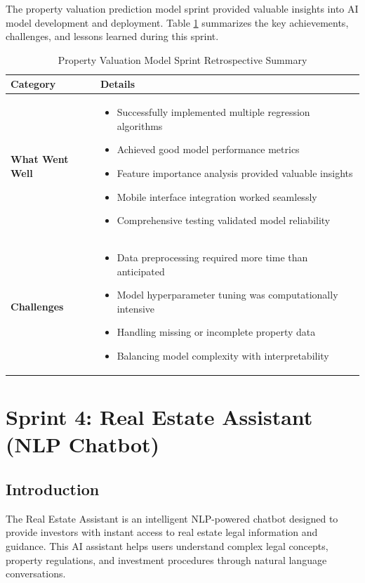 The property valuation prediction model sprint provided valuable insights into AI model development and deployment. Table \ref{tab:valuation-retrospective} summarizes the key achievements, challenges, and lessons learned during this sprint.
\newpage
\begin{table}[htbp]
    \centering
    \begin{tabular}{|p{3cm}|p{10cm}|}
        \hline
        \textbf{Category} & \textbf{Details} \\
        \hline
        \textbf{What Went Well} & 
        \begin{itemize}
            \item Successfully implemented multiple regression algorithms
            \item Achieved good model performance metrics
            \item Feature importance analysis provided valuable insights
            \item Mobile interface integration worked seamlessly
            \item Comprehensive testing validated model reliability
        \end{itemize} \\
        \hline
        \textbf{Challenges} & 
        \begin{itemize}
            \item Data preprocessing required more time than anticipated
            \item Model hyperparameter tuning was computationally intensive
            \item Handling missing or incomplete property data
            \item Balancing model complexity with interpretability
        \end{itemize} \\
        \hline
    \end{tabular}
    \caption{Property Valuation Model Sprint Retrospective Summary}
    \label{tab:valuation-retrospective}
\end{table}

\newpage

\section{Sprint 4: Real Estate Assistant (NLP Chatbot)}
\subsection*{Introduction}
The Real Estate Assistant is an intelligent NLP-powered chatbot designed to provide investors with instant access to real estate legal information and guidance. This AI assistant helps users understand complex legal concepts, property regulations, and investment procedures through natural language conversations.

